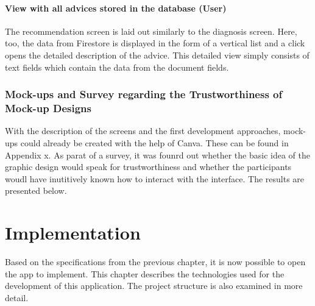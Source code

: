 \subsubsection{\textbf{View with all advices stored in the database (User) }}
The recommendation screen is laid out similarly to the diagnosis screen. Here, too, the data from Firestore is displayed in the form of a vertical list and a click opens the detailed description of the advice. This detailed view simply consists of text fields which contain the data from the document fields.
\subsection{Mock-ups and Survey regarding the Trustworthiness of Mock-up Designs}
With the description of the screens and the first development approaches, mock-ups could already be created with the help of Canva. These can be found in Appendix x. As parat of a survey, it was founrd out whether the basic idea of the graphic design would speak for trustworthiness and whether the participants woudl have inutitively known how to interact with the interface. The results are presented below.


\chapter{Implementation}
Based on the specifications from the previous chapter, it is now possible to open the app to implement. This chapter describes the technologies used for the development of this application. The project structure is also examined in more detail.
